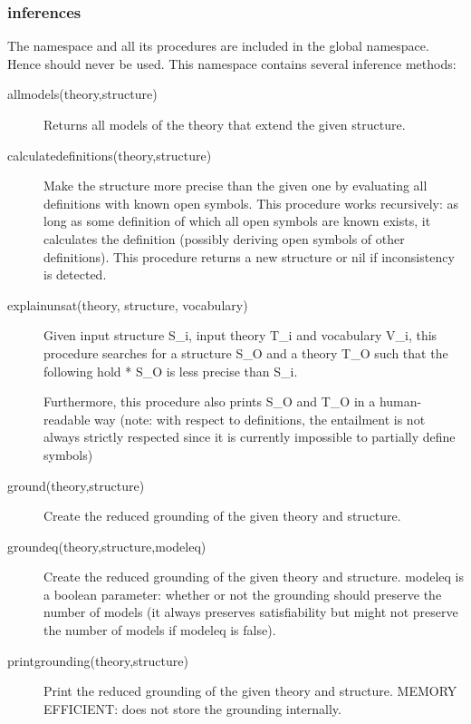 \subsubsection{inferences}
The  namespace and all its procedures are included in the global namespace. Hence  should never be used. This namespace contains several inference methods:
\begin{description}
	\item[allmodels(theory,structure)] 
		Returns all models of the theory that extend the given structure.
	\item[calculatedefinitions(theory,structure)]
		Make the structure more precise than the given one by evaluating all definitions with known open symbols. This procedure works recursively: as long as some definition of which all open symbols are known exists, it calculates the definition (possibly deriving open symbols of other definitions). This procedure returns a new structure or  nil if inconsistency is detected.
	\item[explainunsat(theory, structure, vocabulary)]
		Given input structure S_i, input theory T_i and vocabulary V_i, this procedure searches for a structure S_O and a theory T_O such that the following hold * S_O is less precise than S_i.
Furthermore, this procedure also prints S_O and T_O in a human-readable way
(note: with respect to definitions, the entailment is not always strictly respected since it is currently impossible to partially define symbols)

	\item[ground(theory,structure)]
 		Create the reduced grounding of the given theory and structure. 
 	\item[groundeq(theory,structure,modeleq)]
 		Create the reduced grounding of the given theory and structure. modeleq is a boolean parameter:  whether or not the grounding should preserve the number of models (it always preserves satisfiability but might not preserve the number of models if modeleq is false).
 	\item[printgrounding(theory,structure)]
 		Print the reduced grounding of the given theory and structure.
 		MEMORY EFFICIENT: does not store the grounding internally.
 		

\end{description}
